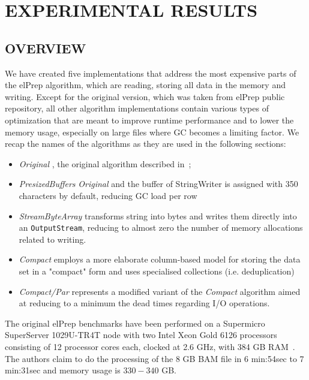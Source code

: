 \documentclass[a4paper,twoside]{article}
\begin{document}
\section{\uppercase{Experimental Results}}
\label{sec:results}

\subsection{\uppercase{Overview}}
\label{subsec:overview}

We have created five implementations that address the most expensive parts of the elPrep algorithm, which are reading,  storing all data in the memory and writing.
Except for the original version, which was taken from elPrep public repository, all other algorithm implementations contain various types of optimization that are meant to improve runtime performance and to lower the memory usage, especially on large files where GC becomes a limiting factor. 
We recap the names of the algorithms as they are used in the following sections:
\begin{itemize}
\item {\textit{Original} }, the original algorithm described in~\cite{costanza:2019};

\item {\textit{PresizedBuffers} } {\textit{Original}} and the buffer of StringWriter is assigned with 350 characters by default, reducing GC load per row

\item {\textit{StreamByteArray} } transforms string into bytes and writes them directly into an \texttt{OutputStream}, reducing to almost zero the number of memory allocations related to writing.

\item {\textit{Compact} } employs a more elaborate column-based model for storing the data set in a "compact" form and uses specialised collections (i.e. deduplication)

\item {\textit{Compact/Par} } represents a modified variant of the {\textit{Compact} } algorithm aimed at reducing to a minimum the dead times regarding I/O operations.

\end{itemize}


The original elPrep benchmarks have been performed on a Supermicro SuperServer 1029U-TR4T node with two
Intel Xeon Gold 6126 processors consisting of 12 processor cores each, clocked at 2.6 GHz, with 384 GB RAM~\cite{costanza:2019}. The authors claim to do the processing of the 8 GB BAM file in 6 min:54sec to 7 min:31sec and memory usage is $330-340$ GB\@.
\end{document}
